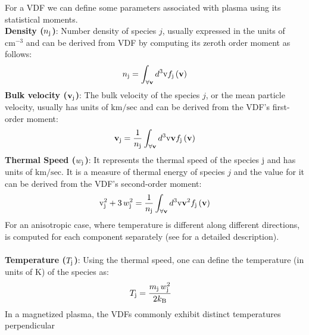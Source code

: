            For a VDF we can define some parameters associated with plasma using its statistical
            moments.\\
            \textbf{Density ($n_{\rm j}$)}: Number density of species $j$, usually expressed in the
            units of $\mathrm{cm^{-3}}$ and can be derived from VDF by computing its zeroth order
            moment as follows:
            \begin{align}
                n_{\rm j} = \int_{\forall \mathbf{v}} d^3\mathrm{v} \mathnormal{f}_{\rm j}\left(\mathbf{v}\right) \label{eq:numden}
            \end{align}
            \textbf{Bulk velocity ($\mathbf{v}_{\rm j}$)}: The bulk velocity of the species $j$, or
            the mean particle velocity, usually has units of $\mathrm{km/sec}$ and can be derived
            from the VDF's first-order moment:
            \begin{align}
                \mathbf{v}_{\rm j} = \frac{1}{n_{\rm j}}\int_{\forall \mathbf{v}} d^3\mathrm{v} \mathbf{v} \mathnormal{f}_{\rm j}\left(\mathbf{v}\right) \label{eq:blkvel}
            \end{align}
            \textbf{Thermal Speed ($w_{\rm j}$)}: It represents the thermal speed of the species j
            and has units of $\mathrm{km/sec}$. It is a measure of thermal energy of species $j$ and
            the value for it can be derived from the VDF's second-order moment:
            \begin{align}
                \mathrm{v}_{\rm j}^2 + 3\,w_{\rm j}^2 = \frac{1}{n_{\rm j}}\int_{\forall \mathbf{v}} d^3\mathrm{v} \mathbf{v}^2 \mathnormal{f}_{\rm j}\left(\mathbf{v}\right) \label{eq:wtherm}
            \end{align}
            For an anisotropic case, where temperature is different along different directions,
             is computed for each component separately (see \citet[\S
            1.4.1]{Verscharen2019} for a detailed description).\\
            \\
            \textbf{Temperature ($T_{\rm j}$)}: Using the thermal speed, one can define the
            temperature (in units of K) of the species as:
            \begin{align}
                T_{\rm j} & = \frac{m_{\rm j}\,w_{\rm j}^2}{2k_{\rm B}} \label{eq:temp}
            \end{align}
            In a magnetized plasma, the VDFs commonly exhibit distinct temperatures perpendicular
